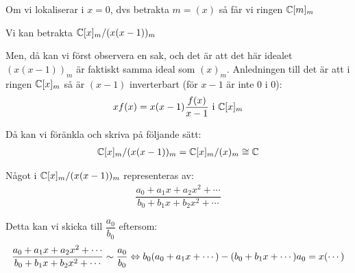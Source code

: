 \par\bigskip
\noindent Om vi lokaliserar i $x=0$, dvs betrakta $m = (x)$ så får vi ringen $\mathbb{C}[m]_m$\par
\noindent Vi kan betrakta $\mathbb{C}[x]_m/(x(x-1))_m$
\par\bigskip
\noindent Men, då kan vi först observera en sak, och det är att det här idealet $(x(x-1))_m$ är faktiskt samma ideal som $(x)_m$. Anledningen till det är att i ringen $\mathbb{C}[x]_m$ så är $(x-1)$ inverterbart (för $x-1$ är inte 0 i 0):
\begin{equation*}
  \begin{gathered}
    xf(x) = x(x-1)\dfrac{f(x)}{x-1}\text{ i } \mathbb{C}[x]_m
  \end{gathered}
\end{equation*}\par
\noindent Då kan vi föränkla och skriva på följande sätt:
\begin{equation*}
  \begin{gathered}
    \mathbb{C}[x]_m/(x(x-1))_m = \mathbb{C}[x]_m/(x)_m \cong \mathbb{C}
  \end{gathered}
\end{equation*}\par
\noindent Något i $\mathbb{C}[x]_m/(x(x-1))_m$ representeras av:
\begin{equation*}
  \begin{gathered}
    \dfrac{a_0+a_1x+a_2x^2+\cdots}{b_0+b_1x+b_2x^2+\cdots}
  \end{gathered}
\end{equation*}\par
\noindent Detta kan vi skicka till $\dfrac{a_0}{b_0}$ eftersom:
\begin{equation*}
  \begin{gathered}
    \dfrac{a_0+a_1x+a_2x^2+\cdots}{b_0+b_1x+b_2x^2+\cdots} \sim\dfrac{a_0}{b_0}\Leftrightarrow b_0(a_0+a_1x+\cdots)-(b_0+b_1x+\cdots)a_0 = x(\cdots)
  \end{gathered}
\end{equation*}
\newpage
